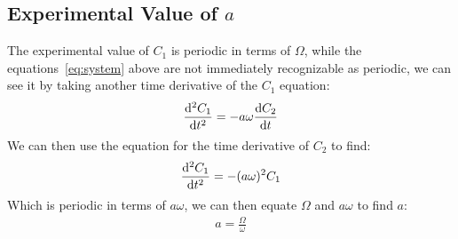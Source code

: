 \subsection{Experimental Value of $a$}
The experimental value of $C_1$ is periodic in terms of $\Omega$, while the equations~\eqref{eq:system} above are not immediately recognizable as periodic, we can see it by taking another time derivative of the $C_1$ equation:
\begin{align*}
  \dv[2]{C_1}{t}=-a\omega\dv{C_2}{t}
\end{align*}
We can then use the equation for the time derivative of $C_2$ to find:
\begin{align*}
  \dv[2]{C_1}{t}=-(a\omega)^2C_1
\end{align*}
Which is periodic in terms of $a\omega$, we can then equate $\Omega$ and $a\omega$ to find $a$:
\begin{align*}
  \boxed{a=\frac\Omega\omega}
\end{align*}
